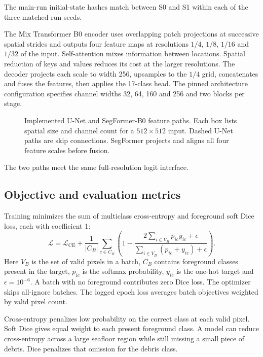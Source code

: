 The main-run initial-state hashes match between S0 and S1 within each of the three matched run seeds.

The Mix Transformer B0 encoder uses overlapping patch projections at successive spatial strides and outputs four feature maps at resolutions $1/4$, $1/8$, $1/16$ and $1/32$ of the input. Self-attention mixes information between locations. Spatial reduction of keys and values reduces its cost at the larger resolutions. The decoder projects each scale to width 256, upsamples to the $1/4$ grid, concatenates and fuses the features, then applies the 17-class head. The pinned architecture configuration specifies channel widths 32, 64, 160 and 256 and two blocks per stage\cite{segformerconfig}.

\clearpage
\begingroup
{}
\setlength{\intextsep}{7pt}
\begin{figure}[H]\centering
\scalebox{.84}{}
\caption{Implemented U-Net and SegFormer-B0 feature paths. Each box lists spatial size and channel count for a $512\times512$ input. Dashed U-Net paths are skip connections. SegFormer projects and aligns all four feature scales before fusion.}\label{fig:models}
\end{figure}
The two paths meet the same full-resolution logit interface.

\subsection{Objective and evaluation metrics}
Training minimizes the sum of multiclass cross-entropy and foreground soft Dice loss, each with coefficient 1:
\begin{equation}
\mathcal L=\mathcal L_{\mathrm{CE}}+\frac{1}{|C_B|}\sum_{c\in C_B}\left(1-\frac{2\sum_{i\in V_B}p_{ic}y_{ic}+\epsilon}{\sum_{i\in V_B}(p_{ic}+y_{ic})+\epsilon}\right).
\end{equation}
Here $V_B$ is the set of valid pixels in a batch, $C_B$ contains foreground classes present in the target, $p_{ic}$ is the softmax probability, $y_{ic}$ is the one-hot target and $\epsilon=10^{-6}$. A batch with no foreground contributes zero Dice loss. The optimizer skips all-ignore batches. The logged epoch loss averages batch objectives weighted by valid pixel count.

Cross-entropy penalizes low probability on the correct class at each valid pixel. Soft Dice gives equal weight to each present foreground class. A model can reduce cross-entropy across a large seafloor region while still missing a small piece of debris. Dice penalizes that omission for the debris class.


